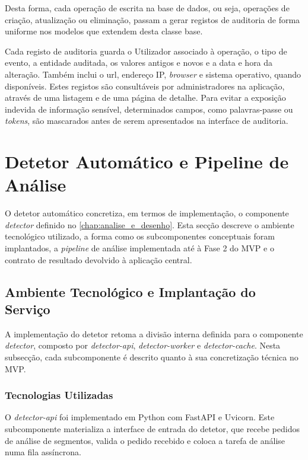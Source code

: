 Desta forma, cada operação de escrita na base de dados, ou seja, operações de criação, atualização ou eliminação, passam a gerar registos de auditoria de forma uniforme nos modelos que extendem desta classe base.

Cada registo de auditoria guarda o Utilizador associado à operação, o tipo de evento, a entidade auditada, os valores antigos e novos e a data e hora da alteração. Também inclui o url, endereço IP, \textit{browser} e sistema operativo, quando disponíveis. Estes registos são consultáveis por administradores na aplicação, através de uma listagem e de uma página de detalhe. Para evitar a exposição indevida de informação sensível, determinados campos, como palavras-passe ou \textit{tokens}, são mascarados antes de serem apresentados na interface de auditoria.

\section{Detetor Automático e Pipeline de Análise}
\label{sec:detetor_automatico}
O detetor automático concretiza, em termos de implementação, o componente \textit{detector} definido no \autoref{chap:analise_e_desenho}. Esta secção descreve o ambiente tecnológico utilizado, a forma como os subcomponentes conceptuais foram implantados, a \textit{pipeline} de análise implementada até à Fase 2 do \gls{MVP} e o contrato de resultado devolvido à aplicação central.

\subsection{Ambiente Tecnológico e Implantação do Serviço}

A implementação do detetor retoma a divisão interna definida para o componente \textit{detector}, composto por \textit{detector-api}, \textit{detector-worker} e \textit{detector-cache}. Nesta subsecção, cada subcomponente é descrito quanto à sua concretização técnica no \gls{MVP}.

\subsubsection{Tecnologias Utilizadas}
O \textit{detector-api} foi implementado em Python com FastAPI e Uvicorn. Este subcomponente materializa a interface de entrada do detetor, que recebe pedidos de análise de segmentos, valida o pedido recebido e coloca a tarefa de análise numa fila assíncrona.

